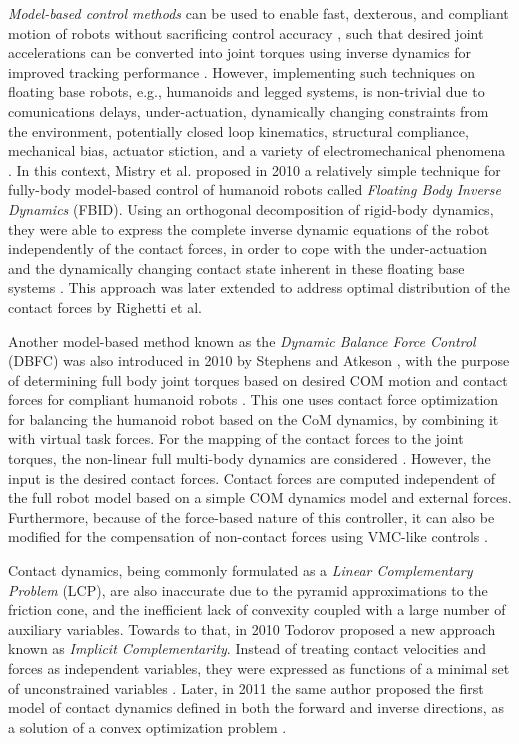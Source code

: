 	\emph{Model-based control methods} can be used to enable fast, dexterous, and compliant motion of
	robots without sacrificing control accuracy \cite{Mistry_ICRA2010}, such that desired joint
	accelerations can be converted into joint torques using inverse dynamics for improved tracking
	performance \cite{Stephens_IROS2010}.
	However, implementing such techniques on floating base robots, e.g., humanoids and legged systems,
	is non-trivial due to comunications delays, under-actuation, dynamically changing constraints from
	the environment, potentially closed loop kinematics, structural compliance, mechanical bias, actuator
	stiction, and a variety of electromechanical phenomena \cite{Mistry_ICRA2010} \cite{Hopkins_ICRA2015}.
	In this context, Mistry et al. \cite{Mistry_ICRA2010} proposed in 2010 a relatively simple technique
	for fully-body model-based control of humanoid robots called \emph{Floating Body Inverse Dynamics}
	(FBID).
	Using an orthogonal decomposition of rigid-body dynamics, they were able to express the complete
	inverse dynamic equations of the robot independently of the contact forces, in order to cope with the
	under-actuation and the dynamically changing contact state inherent in these floating base systems
	\cite{Mistry_ICRA2010}.
	This approach was later extended to address optimal distribution of the contact forces by
	Righetti et al. \cite{Righetti_CLAWAR2010}
	
	Another model-based method known as the \emph{Dynamic Balance Force Control} (DBFC) was also introduced
	in 2010 by Stephens and Atkeson \cite{Stephens_IROS2010} \cite{Stephens_PhDThesis2011}, with the purpose
	of determining full body joint torques based on desired COM motion and contact forces for compliant
	humanoid robots \cite{Stephens_IROS2010}.
	This one uses contact force optimization for balancing the humanoid robot based on the CoM dynamics,
	by combining it with virtual task forces.
	For the mapping of the contact forces to the joint torques, the non-linear full multi-body dynamics are
	considered \cite{Ott_Humanoids2011}.
	However, the input is the desired contact forces.
	Contact forces are computed independent of the full robot model based on a simple COM dynamics model and
	external forces.
	Furthermore, because of the force-based nature of this controller, it can also be modified for the
	compensation of non-contact forces using VMC-like controls \cite{Stephens_IROS2010}.
	
	Contact dynamics, being commonly formulated as a \emph{Linear Complementary Problem} (LCP), are also
	inaccurate due to the pyramid approximations to the friction cone, and the inefficient lack of convexity
	coupled with a large number of auxiliary variables.
	Towards to that, in 2010 Todorov \cite{Todorov_ICRA2010} proposed a new approach known as
	\emph{Implicit Complementarity}.
	Instead of treating contact velocities and forces as independent variables, they were expressed as
	functions of a minimal set of unconstrained variables \cite{Todorov_ICRA2010}.
	Later, in 2011 the same author \cite{Todorov_ICRA2011} proposed the first model of contact dynamics
	defined in both the forward and inverse directions, as a solution of a convex optimization problem
	\cite{Todorov_ICRA2011}.
	
